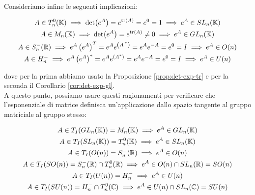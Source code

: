 {Consideriamo infine le seguenti implicazioni:

\begin{gather}
	A \in T^{0}_{n}(\K) %
	\implies \det(e^{A}) = e^{\tr(A)} = e^{0} = 1 %
	\implies e^{A} \in SL_{n}(\K) \\
	A \in M_{n}(\K) %
	\implies \det(e^{A}) = e^{\tr(A)} \neq 0 %
	\implies e^{A} \in GL_{n}(\K) \\
	A \in S^{-}_{n}(\R) %
	\implies e^{A} \left( e^{A} \right)^{T} = e^{A} e^{\left( A^{T} \right)} = e^{A} e^{-A} = e^{0} = I %
	\implies e^{A} \in O(n) \\
	A \in H^{-}_{n} %
	\implies e^{A} \left( e^{A} \right)^{*} = e^{A} e^{\left( A^{*} \right)} = e^{A} e^{-A} = e^{0} = I %
	\implies e^{A} \in U(n)
\end{gather}

dove per la prima abbiamo usato la Proposizione \ref{prop:det-exp-tr} e per la seconda il Corollario \ref{cor:det-exp-gl}. \\
A questo punto, possiamo usare questi ragionamenti per verificare che l'esponenziale di matrice definisca un'applicazione dallo spazio tangente al gruppo matriciale al gruppo stesso:

\begin{gather}
	A \in T_{I}(GL_{n}(\K)) = M_{n}(\K) %
	\implies e^{A} \in GL_{n}(\K) \\
	A \in T_{I}(SL_{n}(\K)) = T^{0}_{n}(\K) %
	\implies e^{A} \in SL_{n}(\K) \\
	A \in T_{I}(O(n)) = S^{-}_{n}(\R) %
	\implies e^{A} \in O(n) \\
	A \in T_{I}(SO(n)) = S^{-}_{n}(\R) \cap T^{0}_{n}(\R) %
	\implies e^{A} \in O(n) \cap SL_{n}(\R) = SO(n) \\
	A \in T_{I}(U(n)) = H^{-}_{n} %
	\implies e^{A} \in U(n) \\
	A \in T_{I}(SU(n)) = H^{-}_{n} \cap T^{0}_{n}(\C) %
	\implies e^{A} \in U(n) \cap SL_{n}(\C) = SU(n)
\end{gather}
}


